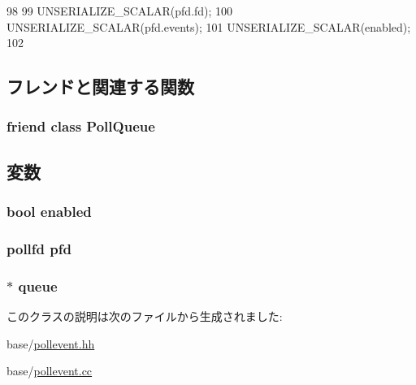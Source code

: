 \begin{DoxyCode}
98 {
99     UNSERIALIZE_SCALAR(pfd.fd);
100     UNSERIALIZE_SCALAR(pfd.events);
101     UNSERIALIZE_SCALAR(enabled);
102 }
\end{DoxyCode}


\subsection{フレンドと関連する関数}
\hypertarget{classPollEvent_a038a8fd0c5373555638bb67fab4a6d63}{
\subsubsection[{PollQueue}]{\setlength{\rightskip}{0pt plus 5cm}friend class {\bf PollQueue}}}
\label{classPollEvent_a038a8fd0c5373555638bb67fab4a6d63}


\subsection{変数}
\hypertarget{classPollEvent_a8740ba80e30dd75e71d09fa1dcf04f3d}{
\subsubsection[{enabled}]{\setlength{\rightskip}{0pt plus 5cm}bool {\bf enabled}}}
\label{classPollEvent_a8740ba80e30dd75e71d09fa1dcf04f3d}
\hypertarget{classPollEvent_ae6c60b22ef902803b43cab37d21290a2}{
\subsubsection[{pfd}]{\setlength{\rightskip}{0pt plus 5cm}pollfd {\bf pfd}}}
\label{classPollEvent_ae6c60b22ef902803b43cab37d21290a2}
\hypertarget{classPollEvent_a4d805f3ad1c8fec3eebbc665ddab7619}{
\subsubsection[{queue}]{$\ast$ {\bf queue}}}
\label{classPollEvent_a4d805f3ad1c8fec3eebbc665ddab7619}


このクラスの説明は次のファイルから生成されました:\begin{DoxyCompactItemize}
\item 
base/\hyperlink{pollevent_8hh}{pollevent.hh}\item 
base/\hyperlink{pollevent_8cc}{pollevent.cc}\end{DoxyCompactItemize}
